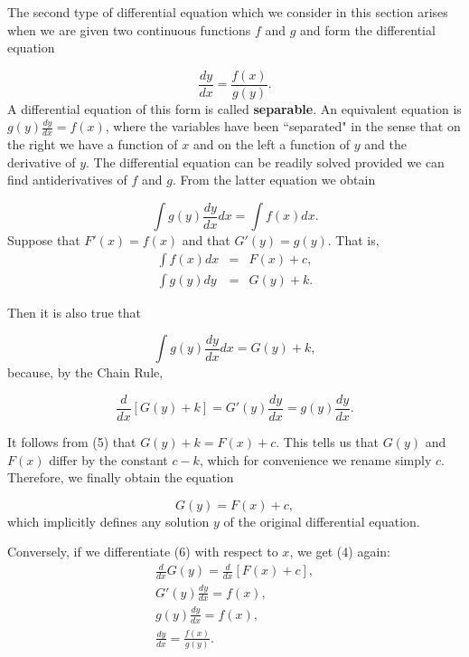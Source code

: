 The second type of differential equation which we consider in this section arises when we are given two continuous functions $f$ and $g$ and form the differential equation

\begin{equation}
\frac{dy}{dx} = \frac{f(x)}{g(y)}.
\label{eq5.5.4}
\end{equation}
\noindent A differential equation of this form is called \textbf{separable}. An equivalent equation is $g(y)\frac{dy}{dx} = f(x)$, where the variables have been ``separated" in the sense that on the right we have a function of $x$ and on the left a function of $y$ and the derivative of $y$. The differential equation can be readily solved provided we can find antiderivatives of $f$ and $g$.  From the latter equation we obtain

\begin{equation}
\int g(y) \frac{dy}{dx} dx = \int f(x)dx.
\label{eq5.5.5}
\end{equation}
\noindent Suppose that $F'(x) = f(x)$ and that $G'(y) = g(y) $. That is,
\begin{eqnarray*}
\int f (x) dx &=& F(x) + c, \\
 \int g(y)dy &=& G(y) + k.
\end{eqnarray*}

\noindent Then it is also true that 

$$
\int g(y) \frac{dy}{dx} dx = G(y) + k, 
$$
\noindent because, by the Chain Rule,

$$
\frac{d}{dx}[G(y) + k] = G'(y)\frac{dy}{dx} = g(y) \frac{dy}{dx}.
$$

\noindent It follows from (5) that $G(y) + k = F(x) + c$. This tells us that $G(y)$ and $F(x)$ differ by the constant $c-k$, which for convenience we rename simply $c$. Therefore, we finally obtain the equation

\begin{equation}
G(y) = F(x) + c,     
\label{eq5.5.6}
\end{equation}
\noindent which implicitly defines any solution $y$ of the original differential equation.

Conversely, if we differentiate (6) with respect to $x$, we get (4) again: 
\begin{eqnarray*}
\frac{d}{dx} G(y) = \frac{d}{dx} [F(x) + c], \\
G'(y) \frac{dy}{dx} = f (x), \\
g(y) \frac{dy}{dx} = f (x),\\
\frac{dy}{dx}= \frac{f(x)}{g(y)}.
\end{eqnarray*}


